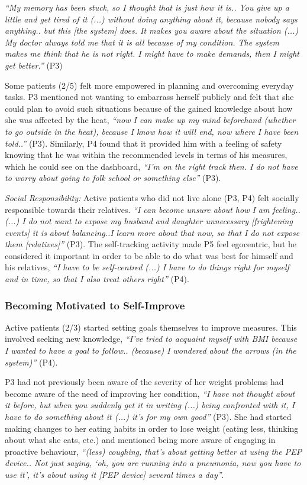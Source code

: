 \textit{“My memory has been stuck, so I thought that is just how it is.. You give up a little and get tired of it (...) without doing anything about it, because nobody says anything.. but this [the system] does. It makes you aware about the situation (...) My doctor always told me that it is all because of my condition. The system makes me think that he is not right. I might have to make demands, then I might get better.”} (P3) 

Some patients (2/5) felt more empowered in planning and overcoming everyday tasks. P3 mentioned not wanting to embarrass herself publicly and felt that she could plan to avoid such situations because of the gained knowledge about how she was affected by the heat, \textit{“now I can make up my mind beforehand (whether to go outside in the heat), because I know how it will end, now where I have been told..”} (P3). Similarly, P4 found that it provided him with a feeling of safety knowing that he was within the recommended levels in terms of his measures, which he could see on the dashboard, \textit{“I’m on the right track then. I do not have to worry about going to folk school or something else”} (P3). 

\textit{Social Responsibility:} Active patients who did not live alone (P3, P4) felt socially responsible towards their relatives. \textit{“I can become unsure about how I am feeling.. (...) I do not want to expose my husband and daughter unnecessary [frightening events] it is about balancing..I learn more about that now, so that I do not expose them [relatives]”} (P3). The self-tracking activity made P5 feel egocentric, but he considered it important in order to be able to do what was best for himself and his relatives, \textit{“I have to be self-centred (...) I have to do things right for myself and in time, so that I also treat others right”} (P4). 

\subsubsection{Becoming Motivated to Self-Improve}
Active patients (2/3) started setting goals themselves to improve measures. This involved seeking new knowledge, \textit{“I’ve tried to acquaint myself with BMI because I wanted to have a goal to follow.. (because) I wondered about the arrows (in the system)”} (P4). 

P3 had not previously been aware of the severity of her weight problems had become aware of the need of improving her condition, \textit{“I have not thought about it before, but when you suddenly get it in writing (...) being confronted with it, I have to do something about it (...) it’s for my own good”} (P3). She had started making changes to her eating habits in order to lose weight (eating less, thinking about what she eats, etc.) and mentioned being more aware of engaging in proactive behaviour, \textit{“(less) coughing, that’s about getting better at using the PEP device.. Not just saying, ‘oh, you are running into a pneumonia, now you have to use it’, it’s about using it [PEP device] several times a day”}. 

